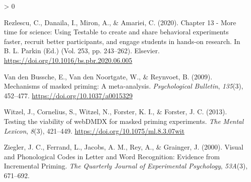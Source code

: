 \documentclass[
  english,
  man]{apa6}
\newlength{\cslhangindent}
\newenvironment{CSLReferences}[2] %
 {%
  \setlength{\parindent}{0pt}
  \ifodd #1 \everypar{\setlength{\hangindent}{\cslhangindent}}\ignorespaces\fi
  \ifnum #2 > 0
  \setlength{\parskip}{#2\baselineskip}
  \fi
 }%
 {}
\begin{document}
\begin{CSLReferences}{1}{0}
\leavevmode\hypertarget{ref-rezlescu2020}{}%
Rezlescu, C., Danaila, I., Miron, A., \& Amariei, C. (2020). Chapter 13 - More time for science: Using Testable to create and share behavioral experiments faster, recruit better participants, and engage students in hands-on research. In B. L. Parkin (Ed.) (Vol. 253, pp. 243--262). Elsevier. \url{https://doi.org/10.1016/bs.pbr.2020.06.005}

\leavevmode\hypertarget{ref-vandenbusscheMechanismsMaskedPriming2009}{}%
Van den Bussche, E., Van den Noortgate, W., \& Reynvoet, B. (2009). Mechanisms of masked priming: {A} meta-analysis. \emph{Psychological Bulletin}, \emph{135}(3), 452--477. \url{https://doi.org/10.1037/a0015329}

\leavevmode\hypertarget{ref-witzelTestingViabilityWebDMDX2013}{}%
Witzel, J., Cornelius, S., Witzel, N., Forster, K. I., \& Forster, J. C. (2013). Testing the viability of {webDMDX} for masked priming experiments. \emph{The Mental Lexicon}, \emph{8}(3), 421--449. \url{https://doi.org/10.1075/ml.8.3.07wit}

\leavevmode\hypertarget{ref-ziegler2000}{}%
Ziegler, J. C., Ferrand, L., Jacobs, A. M., Rey, A., \& Grainger, J. (2000). Visual and Phonological Codes in Letter and Word Recognition: Evidence from Incremental Priming. \emph{The Quarterly Journal of Experimental Psychology}, \emph{53A}(3), 671--692.

\end{CSLReferences}

\endgroup
\end{document}
